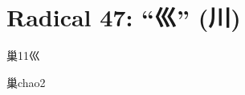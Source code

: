 
\section*{Radical 47: ``⼮'' (川)}

\begin{entry}{巢}{11}{⼮}
  \begin{phonetics}{巢}{chao2}
  \end{phonetics}
\end{entry}



